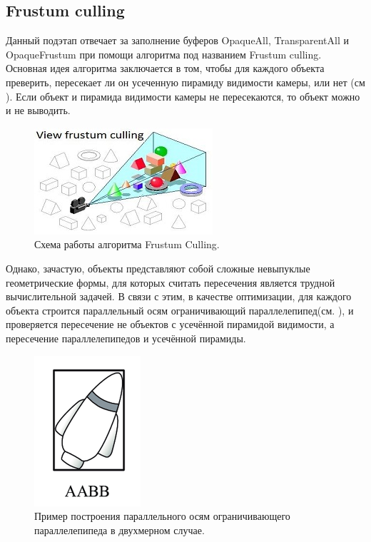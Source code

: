 	\subsection{Frustum culling} \label{ch3:pre_pass:frustum}
		Данный подэтап отвечает за заполнение буферов OpaqueAll, TransparentAll и OpaqueFrustum при помощи алгоритма под названием Frustum culling\cite{assarsson2000optimized}. Основная идея алгоритма заключается в том, чтобы для каждого объекта преверить, пересекает ли он усеченную пирамиду видимости камеры, или нет (см ). Если объект и пирамида видимости камеры не пересекаются, то объект можно и не выводить.
		\begin{figure}[ht!] 
			\center
			\includegraphics [scale=1] {my_folder/images//frustum_culling}	
			\caption{Схема работы алгоритма Frustum Culling.} 
			\label{fig:frustum_culling}
		\end{figure}
		
		Однако, зачастую, объекты представляют собой сложные невыпуклые геометрические формы, для которых считать пересечения является трудной вычислительной задачей. В связи с этим, в качестве оптимизации, для каждого объекта строится параллельный осям ограничивающий параллелепипед(см. ), и проверяется пересечение не объектов с усечённой пирамидой видимости, а пересечение параллелепипедов и усечённой пирамиды. 
		
		\begin{figure}[ht!] 
			\center
			\includegraphics [scale=0.8] {my_folder/images//aabb}	
			\caption{Пример построения параллельного осям ограничивающего параллелепипеда в двухмерном случае.} 
			\label{fig:aabb}
		\end{figure}
		
